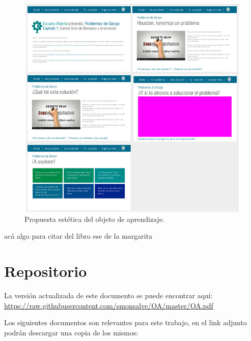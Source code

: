 \documentclass[twoside,letterpaper,11pt]{report}
\begin{document}
\begin{figure}[h!]
\label{propuesta}
\centering
\includegraphics[width=1\textwidth]{aux/propuestaEstetica}
\caption{Propuesta estética del objeto de aprendizaje.}
\end{figure}

acá algo para citar del libro ese de la margarita\cite{5seg}





\newpage

\appendix
\chapter{Repositorio}

La versión actualizada de este documento se puede encontrar aquí:\\
 \url{https://raw.githubusercontent.com/smonsalve/OA/master/OA.pdf}

Los siguientes documentos son relevantes para este trabajo, en el link adjunto podrán descargar una copia de los mismos:
\end{document}
